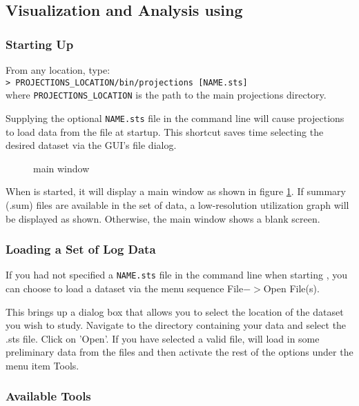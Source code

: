 \documentclass[10pt,dvips]{article}
\begin{document}
\subsection{Visualization and Analysis using \projections{}}

\subsubsection{Starting Up}

From any location, type: \\
{\tt > PROJECTIONS\_LOCATION/bin/projections [NAME.sts]} \\
where {\tt PROJECTIONS\_LOCATION} is the path to the main projections
directory.

Supplying the optional {\tt NAME.sts} file in the command line will
cause projections to load data from the file at startup. This shortcut
saves time selecting the desired dataset via the GUI's file dialog.

\begin{figure}[htb]
\center
{}
\caption{\projections{} main window}
\label{mainwindow}
\end{figure}

When \projections{} is started, it will display a main window as shown
in figure \ref{mainwindow}. If summary (.sum) files are available in
the set of data, a low-resolution utilization graph will be displayed
as shown. Otherwise, the main window shows a blank screen.

\subsubsection{Loading a Set of Log Data}

If you had not specified a {\tt NAME.sts} file in the command line
when starting \projections{}, you can choose to load a dataset via
the menu sequence File$->$Open File(s).

This brings up a dialog box that allows you to select the location of
the dataset you wish to study. Navigate to the directory containing
your data and select the .sts file.  Click on 'Open'.  If you have
selected a valid file, \projections{} will load in some preliminary
data from the files and then activate the rest of the options under
the menu item Tools.

\subsubsection{Available Tools}
\end{document}
